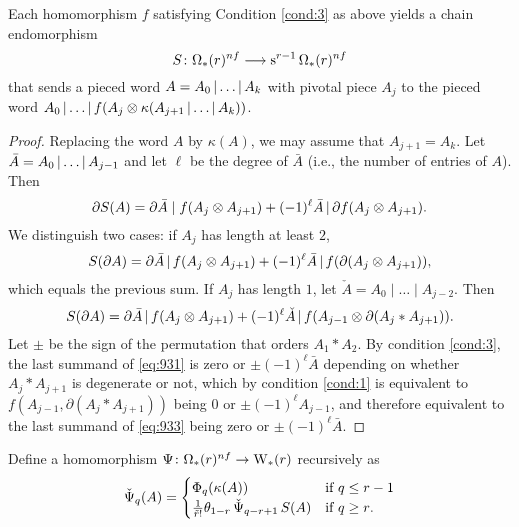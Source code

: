 \begin{theorem} Each homomorphism $f$ satisfying Condition \eqref{cond:3} as above yields a chain endomorphism
\[
    S\colon \Omega_*(r)^{nf}\longrightarrow \operatorname{s}^{r-1}\Omega_*(r)^{nf}
\]
that sends a pieced word $A = A_0\operatorname{|} \ldots\operatorname{|} A_k$ with pivotal piece $A_j$ to the pieced word $ A_0\operatorname{|} \ldots\operatorname{|} f(A_j\otimes \kappa(A_{j+1}\operatorname{|} \ldots\operatorname{|} A_k))$.
\end{theorem}
\begin{proof}
    Replacing the word $A$ by $\kappa(A)$, we may assume that $A_{j+1} = A_k$. Let $\bar{A} = A_0\operatorname{|} \ldots\operatorname{|} A_{j-1}$ and let $\ell$ be the degree of $\bar{A}$ (i.e., the number of entries of $A$). Then %
	\begin{equation}\label{eq:931}
		\partial S(A) = \partial \bar{A}\mid f(A_{j}\otimes A_{j+1}) + (-1)^{\ell}\bar{A}\operatorname{|} \partial f(A_{j}\otimes A_{j+1}).
	\end{equation}
	We distinguish two cases: if $A_j$ has length at least $2$,
	\[S(\partial A) = \partial \bar{A}\operatorname{|} f(A_j\otimes A_{j+1}) + (-1)^{\ell}\bar{A}\operatorname{|} f(\partial (A_j\otimes A_{j+1})),\]
	which equals the previous sum. If $A_j$ has length $1$, let $\check{A} = A_0\mid \ldots\mid A_{j-2}$. Then
	\begin{equation}\label{eq:933}
		S(\partial A) = \partial \bar{A}\operatorname{|} f(A_j\otimes A_{j+1}) + (-1)^\ell \check{A}\operatorname{|} f(A_{j-1}\otimes \partial(A_j*A_{j+1})).
	\end{equation}
	Let $\pm$ be the sign of the permutation that orders $A_1*A_2$. By condition \eqref{cond:3}, the last summand of \eqref{eq:931} is zero or $\pm(-1)^\ell\bar{A}$ depending on whether $A_j*A_{j+1}$ is degenerate or not, which by condition \eqref{cond:1} is equivalent to $f(A_{j-1},\partial(A_j*A_{j+1}))$ being $0$ or $\pm(-1)^{\ell}A_{j-1}$, and therefore equivalent to the last summand of \eqref{eq:933} being zero or $\pm(-1)^{\ell}\bar{A}$.
\end{proof}


\begin{definition}
	Define a homomorphism $\Psi\colon \Omega_*(r)^{nf}\to \mathrm{W}_*(r)$ recursively as
	\[\operatorname{\check{\Psi}}_q(A) = \begin{cases} \Phi_q(\kappa(A)) & \text{if $q\leq r-1$} \\
		\frac{1}{\tilde{r}!}\theta_{1-r}\operatorname{\check{\Psi}}_{q-r+1}S(A) & \text{if $q\geq r$.}\end{cases}\]
\end{definition}

